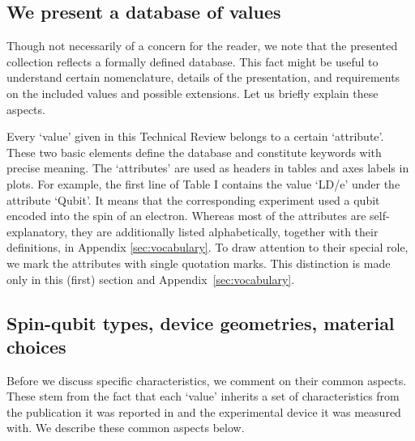 \documentclass[aps, prx, showpacs, twocolumn, superscriptaddress, notitlepage, longbibliography, floatfix, nofootinbib]{revtex4-2}
\newcommand{\myKey}[1]{$\whitearrowupfrombar$\textit{#1}}
\renewcommand{\myKey}[1]{\textit{#1}}
\renewcommand{\myKey}[1]{`{#1}'}
\newcommand{\recheck}[1]{{#1}}
\begin{document}
\subsection{We present a database of values}

Though not necessarily of a concern for the reader, we note that the presented collection reflects a formally defined database. This fact might be useful to understand certain nomenclature, details of the presentation, and requirements on the included values and possible extensions. Let us briefly explain these aspects.

Every \myKey{value} given in this Technical Review belongs to a certain \myKey{attribute}. These two basic elements define the database and constitute keywords with precise meaning. The \myKey{attributes} are used as headers in tables and axes labels in plots. \recheck{For example, the first line of Table I contains the value \myKey{LD/e} under the attribute \myKey{Qubit}.} It means that the corresponding experiment used a qubit encoded into the spin of an electron. Whereas most of the attributes are self-explanatory, they are additionally listed alphabetically, together with their definitions, in Appendix \ref{sec:vocabulary}. To draw attention to their special role, we mark the attributes with single quotation marks.
This distinction is made only in this (first) section and Appendix~\ref{sec:vocabulary}.

\subsection{Spin-qubit types, device geometries, material choices}

Before we discuss specific characteristics, we comment on their common aspects. These stem from the fact that each \myKey{value} inherits a set of characteristics from the publication it was reported in and the experimental device it was measured with. We describe these common aspects below.
\end{document}
